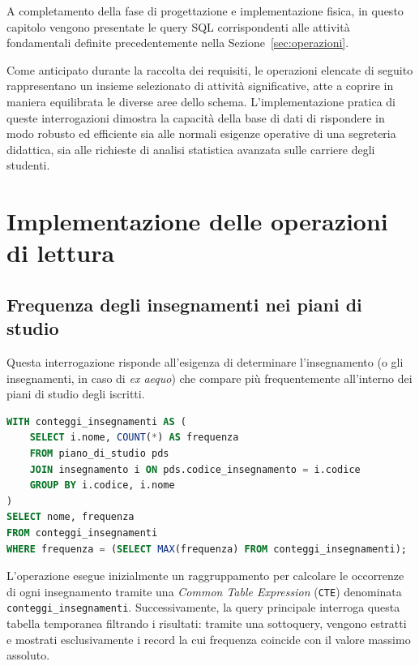 A completamento della fase di progettazione e implementazione fisica, in questo capitolo vengono presentate le query SQL corrispondenti alle attività fondamentali definite precedentemente nella Sezione~\ref{sec:operazioni}.

Come anticipato durante la raccolta dei requisiti, le operazioni elencate di seguito rappresentano un insieme selezionato di attività significative, atte a coprire in maniera equilibrata le diverse aree dello schema.
L'implementazione pratica di queste interrogazioni dimostra la capacità della base di dati di rispondere in modo robusto ed efficiente sia alle normali esigenze operative di una segreteria didattica, sia alle richieste di analisi statistica avanzata sulle carriere degli studenti.

\section{Implementazione delle operazioni di lettura}
\label{sec:implementazione-delle-operazioni-di-lettura}

\subsection{Frequenza degli insegnamenti nei piani di studio}
\label{ssec:frequenza-degli-insegnamenti-nei-piani-di-studio}
Questa interrogazione risponde all'esigenza di determinare l'insegnamento (o gli insegnamenti, in caso di \textit{ex aequo}) che compare più frequentemente all'interno dei piani di studio degli iscritti.

\begin{lstlisting}[language=SQL]
WITH conteggi_insegnamenti AS (
    SELECT i.nome, COUNT(*) AS frequenza
    FROM piano_di_studio pds
    JOIN insegnamento i ON pds.codice_insegnamento = i.codice
    GROUP BY i.codice, i.nome
)
SELECT nome, frequenza
FROM conteggi_insegnamenti
WHERE frequenza = (SELECT MAX(frequenza) FROM conteggi_insegnamenti);
\end{lstlisting}

L'operazione esegue inizialmente un raggruppamento per calcolare le occorrenze di ogni insegnamento tramite una \textit{Common Table Expression} (\texttt{CTE}) denominata \texttt{conteggi\_insegnamenti}.
Successivamente, la query principale interroga questa tabella temporanea filtrando i risultati: tramite una sottoquery, vengono estratti e mostrati esclusivamente i record la cui frequenza coincide con il valore massimo assoluto.


